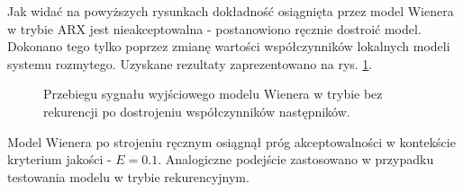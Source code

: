 \documentclass[a4paper,titlepage,11pt,floatssmall]{mwrep}
\begin{document}
Jak widać na powyższych rysunkach dokładność osiągnięta przez model Wienera w trybie ARX jest nieakceptowalna - postanowiono ręcznie dostroić model. Dokonano tego tylko poprzez zmianę wartości współczynników lokalnych modeli systemu rozmytego. Uzyskane rezultaty zaprezentowano na rys. \ref{wien_arx}.

\newpage

\begin{figure}[h!]
\centering
{}
\vfill
{}
\caption{Przebiegu sygnału wyjściowego modelu Wienera w trybie bez rekurencji po dostrojeniu współczynników następników.}
\label{wien_arx}
\end{figure}

Model Wienera po strojeniu ręcznym osiągnął próg akceptowalności w kontekście kryterium jakości - $E = \num{0.1}$. Analogiczne podejście zastosowano w przypadku testowania modelu w trybie rekurencyjnym.

\newpage
\end{document}
